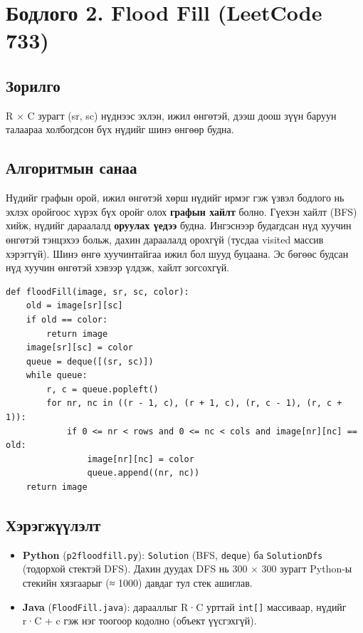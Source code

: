 \documentclass[11pt,a4paper]{article}
\renewcommand{\_}{\oldunderscore\allowbreak}
\begin{document}
\section{Бодлого 2. Flood Fill (LeetCode 733)}

\subsection{Зорилго}
R × C зурагт (sr, sc) нүднээс эхлэн, ижил өнгөтэй, дээш доош зүүн баруун талаараа холбогдсон бүх нүдийг шинэ өнгөөр будна.

\subsection{Алгоритмын санаа}
Нүдийг графын орой, ижил өнгөтэй хөрш нүдийг ирмэг гэж үзвэл бодлого нь эхлэх оройгоос хүрэх бүх оройг олох \textbf{графын хайлт} болно. Гүехэн хайлт (BFS) хийж, нүдийг дараалалд \textbf{оруулах үедээ} будна. Ингэснээр будагдсан нүд хуучин өнгөтэй тэнцэхээ больж, дахин дараалалд орохгүй (тусдаа visited массив хэрэггүй). Шинэ өнгө хуучинтайгаа ижил бол шууд буцаана. Эс бөгөөс будсан нүд хуучин өнгөтэй хэвээр үлдэж, хайлт зогсохгүй.

\begin{Verbatim}
def floodFill(image, sr, sc, color):
    old = image[sr][sc]
    if old == color:
        return image
    image[sr][sc] = color
    queue = deque([(sr, sc)])
    while queue:
        r, c = queue.popleft()
        for nr, nc in ((r - 1, c), (r + 1, c), (r, c - 1), (r, c + 1)):
            if 0 <= nr < rows and 0 <= nc < cols and image[nr][nc] == old:
                image[nr][nc] = color
                queue.append((nr, nc))
    return image
\end{Verbatim}

\subsection{Хэрэгжүүлэлт}
\begin{itemize}
\item \textbf{Python} (\texttt{p2\_flood\_fill.py}): \texttt{Solution} (BFS, \texttt{deque}) ба \texttt{SolutionDfs} (тодорхой стектэй DFS). Дахин дуудах DFS нь 300 × 300 зурагт Python-ы стекийн хязгаарыг (≈ 1000) давдаг тул стек ашиглав.
\item \textbf{Java} (\texttt{FloodFill.java}): дарааллыг R·C урттай \texttt{int[]} массиваар, нүдийг r·C + c гэж нэг тоогоор кодолно (объект үүсгэхгүй).
\end{itemize}
\end{document}
